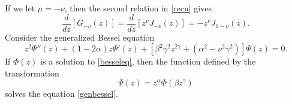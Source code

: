 \documentclass[11pt,letter]{amsart}
\numberwithin{equation}{section}
\numberwithin{equation}{section}
\begin{document}
If we let $\mu = -\nu$, then the second relation in \eqref{recu} gives
\begin{equation}\label{recubis}
\frac{d}{dz} [G_{-\nu}(z)] = \frac{d}{dz}[z^\nu J_{-\nu}(z)] = - z^\nu J_{1-\nu}(z).
\end{equation}
Consider the generalized Bessel equation
\begin{equation}\label{genbessel}
z^2 \Psi''(z) + (1 - 2\alpha) z \Psi'(z) + \left[\beta^2 \gamma^2
z^{2\gamma} + (\alpha^2 - \nu^2 \gamma^2)\right] \Psi(z) = 0.
\end{equation}
If $\Phi(z)$ is a solution to 
\eqref{besseleq}, then the function defined by the
transformation
\begin{equation}\label{besselcv}
\Psi(z) = z^\alpha \Phi(\beta z^\gamma)
\end{equation}
solves the equation \eqref{genbessel}.
\end{document}
